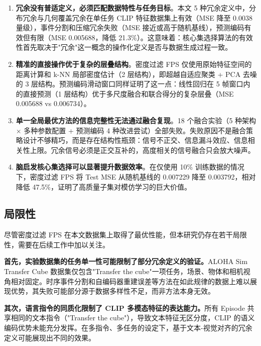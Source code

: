 \documentclass[12pt,a4paper]{article}
\begin{document}
\begin{enumerate}[leftmargin=2em]
    \item \textbf{冗余没有普适定义，必须匹配数据特性与任务目标}。本文 5 种冗余定义中，分布冗余与几何覆盖冗余在单任务 CLIP 特征数据集上有效（MSE 降至 0.0038 量级），事件分割和压缩冗余失败（MSE 接近或高于随机基线），预测编码有效但有限（MSE 0.005688，降低 21.3\%）。这意味着：核心集选择算法的有效性首先取决于"冗余"这一概念的操作化定义是否与数据生成过程一致。
    
    \item \textbf{精准的直接操作优于复杂的层叠结构}。密度过滤 FPS 仅使用原始特征空间的距离计算和 k-NN 局部密度估计（2 层结构），即超越自适应聚类 + PCA 去噪的 3 层结构。预测编码滑动窗口同样证明了这一点：线性回归在 5 帧窗口内的直接预测（1 层结构）优于多尺度融合和联合得分的复杂层叠（MSE 0.005688 vs 0.006734）。
    
    \item \textbf{单一全局最优方法的信息完整性无法通过融合复现}。18 个融合实验（5 种架构 $\times$ 多种参数配置 + 预测编码 4 种改进尝试）全部失败。失败原因不是融合策略设计不够精巧，而是存在结构性瓶颈：信号不正交、信息漏斗效应、信息相关性上限。冗余信号必须是正交互补的，高度相关的信号融合只会放大噪声。
    
    \item \textbf{脑启发核心集选择可以显著提升数据效率}。在仅使用 10\% 训练数据的情况下，密度过滤 FPS 将 Test MSE 从随机基线的 0.007229 降至 0.003792，相对降低 47.5\%，证明了高质量子集对模仿学习的巨大价值。
\end{enumerate}

\subsection{局限性}

尽管密度过滤 FPS 在本文数据集上取得了最优性能，但本研究仍存在若干局限性，需要在后续工作中加以关注。

\textbf{首先，实验数据集的任务单一性可能限制了部分冗余定义的验证。}ALOHA Sim Transfer Cube 数据集仅包含"Transfer the cube"一项任务，场景、物体和相机视角相对固定。时序事件分割和自编码器重建误差等方法在如此规律的数据上难以展现优势，其失败可能部分源于数据多样性不足，而非方法本身无效。

\textbf{其次，语言指令的同质化限制了 CLIP 多模态特征的表达能力。}所有 Episode 共享相同的文本指令（"Transfer the cube"），导致文本特征无区分度，CLIP 的语义编码优势未能充分发挥。在多指令、多任务的设定下，基于文本-视觉对齐的冗余定义可能展现出不同的效果。
\end{document}
